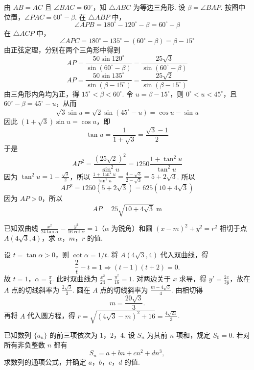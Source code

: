 \begin{solution}
由 \(AB=AC\) 且 \(\angle BAC=60^\circ\)，知 \(\triangle ABC\) 为等边三角形. 设 \(\beta=\angle BAP\). 按图中位置，\(\angle PAC=60^\circ-\beta\). 在 \(\triangle ABP\) 中，
\[
\angle APB=180^\circ-120^\circ-\beta=60^\circ-\beta
\]
在 \(\triangle ACP\) 中，
\[
\angle APC=180^\circ-135^\circ-\left(60^\circ-\beta\right)=\beta-15^\circ
\]
由正弦定理，分别在两个三角形中得到
\[
AP=\frac{50\sin120^\circ}{\sin\left(60^\circ-\beta\right)}=\frac{25\sqrt{3}}{\sin\left(60^\circ-\beta\right)}
\]
\[
AP=\frac{50\sin135^\circ}{\sin\left(\beta-15^\circ\right)}=\frac{25\sqrt{2}}{\sin\left(\beta-15^\circ\right)}
\]
    由三角形内角均为正，得 \(15^\circ<\beta<60^\circ\). 令 \(u=\beta-15^\circ\)，则 \(0^\circ<u<45^\circ\)，且 \(60^\circ-\beta=45^\circ-u\)，从而
\[
\sqrt{3}\sin u=\sqrt{2}\sin\left(45^\circ-u\right)=\cos u-\sin u
\]
因此 \((1+\sqrt{3})\sin u=\cos u\)，即
\[
\tan u=\frac{1}{1+\sqrt{3}}=\frac{\sqrt{3}-1}{2}
\]
于是
\[
AP^2=\frac{(25\sqrt{2})^2}{\sin^2u}=1250\frac{1+\tan^2u}{\tan^2u}
\]
因为 \(\tan^2u=1-\frac{\sqrt{3}}{2}\)，所以
\(\frac{1+\tan^2u}{\tan^2u}=\frac{4-\sqrt{3}}{2-\sqrt{3}}=5+2\sqrt{3}\).
所以
\[
AP^2=1250\left(5+2\sqrt{3}\right)=625\left(10+4\sqrt{3}\right)
\]
因为 \(AP>0\)，所以
\[
AP=25\sqrt{10+4\sqrt{3}}\mathrm{~m}
\]
\end{solution}

\begin{problem}
已知双曲线 \(\frac{x^2}{24\tan\alpha}-\frac{y^2}{16\cot\alpha}=1\)（\(\alpha\) 为锐角）和圆 \(\left(x-m\right)^2+y^2=r^2\) 相切于点 \(A\left(4\sqrt{3},4\right)\)，求 \(\alpha\)，\(m\)，\(r\) 的值.
\end{problem}

\begin{solution}
设 \(t=\tan\alpha>0\)，则 \(\cot\alpha=1/t\). 将 \(A(4\sqrt3,4)\) 代入双曲线，得
\[
\frac{2}{t}-t=1\Longrightarrow(t-1)(t+2)=0.
\]
故 \(t=1\)，\(\alpha=\frac{\pi}{4}\). 此时双曲线为 \(\frac{x^2}{24}-\frac{y^2}{16}=1\).
对两边关于 \(x\) 求导，得 \(y'=\frac{2x}{3y}\)，故在 \(A\) 点的切线斜率为 \(\frac{2\sqrt3}{3}\).
圆在 \(A\) 点的切线斜率为 \(\frac{m-4\sqrt3}{4}\). 由相切得
\[
m=\frac{20\sqrt3}{3}.
\]
再将 \(A\) 代入圆方程，得 \(r=\sqrt{(4\sqrt3-m)^2+16}=\frac{4\sqrt{21}}3\).
\end{solution}

\begin{problem}
已知数列 \(\{a_n\}\) 的前三项依次为 \(1\)，\(2\)，\(4\). 设 \(S_n\) 为其前 \(n\) 项和，规定 \(S_0=0\). 若对所有非负整数 \(n\) 都有
\[
S_n=a+bn+cn^2+dn^3,
\]
求数列的通项公式，并确定 \(a\)，\(b\)，\(c\)，\(d\) 的值.
\end{problem}

